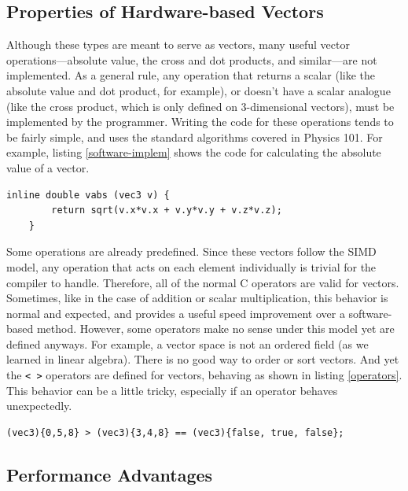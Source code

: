 \documentclass[12pt,twoside]{reedthesis}
\newcommand\code[1]{\colorbox{light-gray}{\texttt{\textcolor{black}{#1}}}}
\begin{document}
\subsection{Properties of Hardware-based Vectors}

Although these types are meant to serve as vectors, many useful vector operations---absolute value, the cross and dot products, and similar---are not implemented. As a general rule, any operation that returns a scalar (like the absolute value and dot product, for example), or doesn't have a scalar analogue (like the cross product, which is only defined on 3-dimensional vectors), must be implemented by the programmer. Writing the code for these operations tends to be fairly simple, and uses the standard algorithms covered in Physics 101. For example, listing \ref{software-implem} shows the code for calculating the absolute value of a vector.

\begin{lstlisting}[caption={Implementing the absolute value function in software\label{software-implem}}]
    inline double vabs (vec3 v) {
        return sqrt(v.x*v.x + v.y*v.y + v.z*v.z);
    }
\end{lstlisting}

Some operations are already predefined. Since these vectors follow the SIMD model, any operation that acts on each element individually is trivial for the compiler to handle. Therefore, all of the normal C operators are valid for vectors. Sometimes, like in the case of addition or scalar multiplication, this behavior is normal and expected, and provides a useful speed improvement over a software-based method. However, some operators make no sense under this model yet are defined anyways. For example, a vector space is not an ordered field (as we learned in linear algebra). There is no good way to order or sort vectors. And yet the \code{< >} operators are defined for vectors, behaving as shown in listing \ref{operators}. This behavior can be a little tricky, especially if an operator behaves unexpectedly.

\begin{lstlisting}[caption={Some operations aren't especially useful\label{operators}}]
    (vec3){0,5,8} > (vec3){3,4,8} == (vec3){false, true, false};
\end{lstlisting}



\subsection{Performance Advantages}
\end{document}
